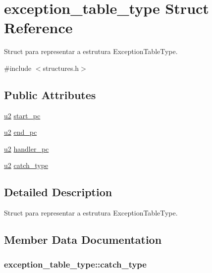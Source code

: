 \hypertarget{structexception__table__type}{}\section{exception\+\_\+table\+\_\+type Struct Reference}
\label{structexception__table__type}


Struct para representar a estrutura Exception\+Table\+Type.  




{\ttfamily \#include $<$structures.\+h$>$}

\subsection*{Public Attributes}
\begin{DoxyCompactItemize}
\item 
\hyperlink{structures_8h_a55ef8d87fd202b8417704c089899c5b9}{u2} \hyperlink{structexception__table__type_a71cf8eaa3d06b89818100df6405b266d}{start\+\_\+pc}
\item 
\hyperlink{structures_8h_a55ef8d87fd202b8417704c089899c5b9}{u2} \hyperlink{structexception__table__type_a796565865a227dc76b0dd7c78e3f8424}{end\+\_\+pc}
\item 
\hyperlink{structures_8h_a55ef8d87fd202b8417704c089899c5b9}{u2} \hyperlink{structexception__table__type_af1b56d902850a41f63b7271029946759}{handler\+\_\+pc}
\item 
\hyperlink{structures_8h_a55ef8d87fd202b8417704c089899c5b9}{u2} \hyperlink{structexception__table__type_a663fa7b2d1a468b29913fd92e006a5dc}{catch\+\_\+type}
\end{DoxyCompactItemize}


\subsection{Detailed Description}
Struct para representar a estrutura Exception\+Table\+Type. 

\subsection{Member Data Documentation}
\subsubsection[{\texorpdfstring{catch\+\_\+type}{catch_type}}]{ exception\+\_\+table\+\_\+type\+::catch\+\_\+type}\hypertarget{structexception__table__type_a663fa7b2d1a468b29913fd92e006a5dc}{}\label{structexception__table__type_a663fa7b2d1a468b29913fd92e006a5dc}
